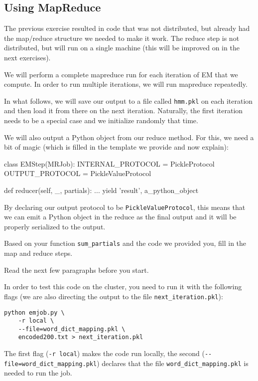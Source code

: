 \subsection{Using MapReduce}
The previous exercise resulted in code that was not distributed, but already
had the map/reduce structure we needed to make it work. The reduce step is not
distributed, but will run on a single machine (this will be improved on in the
next exercises).

We will perform a complete mapreduce run for each iteration of EM that we
compute. In order to run multiple iterations, we will run mapreduce repeatedly.

In what follows, we will save our output to a file called \verb+hmm.pkl+ on
each iteration and then load it from there on the next iteration. Naturally,
the first iteration needs to be a special case and we initialize randomly that
time.

We will also output a Python object from our reduce method. For this, we need a
bit of magic (which is filled in the template we provide and now explain):

\begin{python}
class EMStep(MRJob):
    INTERNAL_PROTOCOL   = PickleProtocol
    OUTPUT_PROTOCOL     = PickleValueProtocol

    def reducer(self, _, partials):
        ...
        yield 'result', a_python_object
\end{python}

By declaring our output protocol to be \verb+PickleValueProtocol+, this means
that we can emit a Python object in the reduce as the final output and it will
be properly serialized to the output.

\begin{exercise}
Based on your function \verb+sum_partials+ and the code we provided you, fill in
the map and reduce steps.

Read the next few paragraphs before you start.
\end{exercise}

In order to test this code on the cluster, you need to run it with the
following flags (we are also directing the output to the file
\verb+next_iteration.pkl+):

\begin{verbatim}
python emjob.py \
    -r local \
    --file=word_dict_mapping.pkl \
    encoded200.txt > next_iteration.pkl
\end{verbatim}

The first flag (\verb+-r local+) makes the code run locally, the second
(\verb+--file=word_dict_mapping.pkl+) declares that the file
\verb+word_dict_mapping.pkl+ is needed to run the job.

